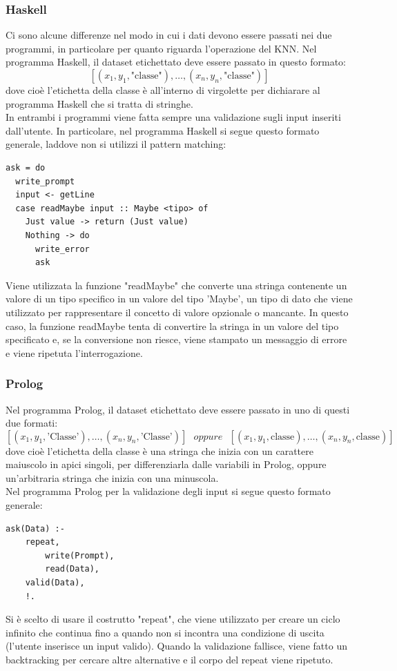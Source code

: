 \documentclass[11pt]{article}
\theoremstyle{definition}
\begin{document}
\subsubsection{Haskell}
Ci sono alcune differenze nel modo in cui i dati devono essere passati nei due programmi, in particolare per quanto riguarda l'operazione del KNN. Nel programma Haskell, il dataset etichettato deve essere passato in questo formato:
$$
[(x_1, y_1, \text{"classe"}), \dots, (x_n, y_n, \text{"classe"})]
$$
dove cioè l'etichetta della classe è all'interno di virgolette per dichiarare al programma Haskell che si tratta di stringhe.\\
\newline
In entrambi i programmi viene fatta sempre una validazione sugli input inseriti dall'utente. In particolare, nel programma Haskell si segue questo formato generale, laddove non si utilizzi il pattern matching:
\begin{verbatim}
ask = do
  write_prompt
  input <- getLine
  case readMaybe input :: Maybe <tipo> of
    Just value -> return (Just value)
    Nothing -> do
      write_error
      ask
\end{verbatim} 
Viene utilizzata la funzione "readMaybe" che converte una stringa contenente un valore di un tipo specifico in un valore del tipo 'Maybe', un tipo di dato che viene utilizzato per rappresentare il concetto di valore opzionale o mancante. In questo caso, la funzione readMaybe tenta di convertire la stringa in un valore del tipo specificato e, se la conversione non riesce, viene stampato un messaggio di errore e viene ripetuta l'interrogazione.

\subsubsection{Prolog}
Nel programma Prolog, il dataset etichettato deve essere passato in uno di questi due formati:
$$
[(x_1, y_1, \text{'Classe'}), \dots, (x_n, y_n, \text{'Classe'})] \ \ \ oppure \ \ \ [(x_1, y_1, \text{classe}), \dots, (x_n, y_n, \text{classe})]
$$
dove cioè l'etichetta della classe è una stringa che inizia con un carattere maiuscolo in apici singoli, per differenziarla dalle variabili in Prolog, oppure un'arbitraria stringa che inizia con una minuscola.\\
\newline
Nel programma Prolog per la validazione degli input si segue questo formato generale:
\begin{verbatim}
ask(Data) :-
    repeat,
        write(Prompt),
        read(Data),
    valid(Data),
    !.
\end{verbatim}
Si è scelto di usare il costrutto "repeat", che viene utilizzato per creare un ciclo infinito che continua fino a quando non si incontra una condizione di uscita (l'utente inserisce un input valido). Quando la validazione fallisce, viene fatto un backtracking per cercare altre alternative e il corpo del repeat viene ripetuto.
\newpage
\end{document}
